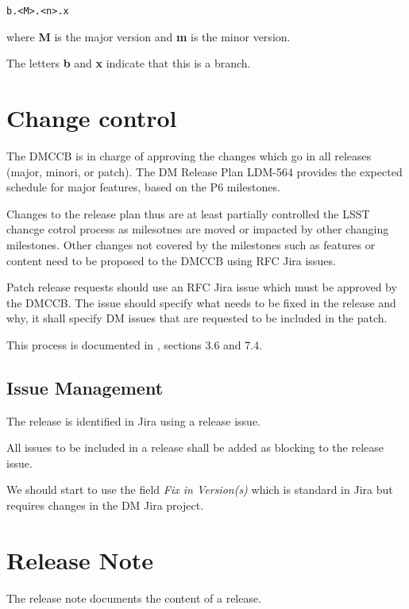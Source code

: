 \begin{verbatim}
b.<M>.<n>.x
\end{verbatim}

where {\bf M} is the major version and {\bf m} is the minor version.

The letters {\bf b} and {\bf x} indicate that this is a branch.

\newpage
\section{Change control} \label{sec:changecontrol}

The DMCCB is in charge of approving the changes which go in  all releases (major, minori, or patch).
The DM Release Plan LDM-564 provides the expected schedule for major features, based on the P6 milestones.

Changes to the release plan  thus are  at least partially controlled the LSST chancge cotrol  process as  milesotnes are moved or impacted by other changing milestones. Other changes not covered by the milestones such as features or content need to be proposed to the DMCCB using RFC Jira issues.

Patch release requests should use an RFC Jira issue which must be approved by the DMCCB.
The issue should specify what needs to be fixed in the release and why, it shall specify DM issues that are requested to be included in the patch.

This process is documented in , sections 3.6 and 7.4.


\subsection{Issue Management} \label{sec:issues}

The release is identified in Jira using a release issue.

All issues to be included in a release shall be added as blocking to the release issue.

We should start to  use the field \textit{Fix in Version(s)} which is standard in Jira
but requires changes in the DM Jira project.


\newpage
\section{Release Note} \label{sec:relnote}

The release note documents the content of a release.


